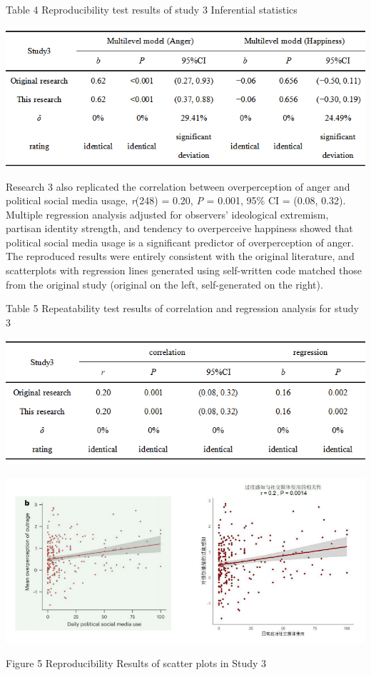 \documentclass[
  man]{apa6}
\begin{document}
\begin{center}
Table 4 Reproducibility test results of study 3 Inferential statistics
\end{center}
\begin{center}
\includegraphics{study3_Reproducibility_Plot.png}
\end{center}

Research 3 also replicated the correlation between overperception of anger and political social media usage, \emph{r}(248) = 0.20, \emph{P} = 0.001, 95\% CI = (0.08, 0.32). Multiple regression analysis adjusted for observers' ideological extremism, partisan identity strength, and tendency to overperceive happiness showed that political social media usage is a significant predictor of overperception of anger. The reproduced results were entirely consistent with the original literature, and scatterplots with regression lines generated using self-written code matched those from the original study (original on the left, self-generated on the right).

\begin{center}
Table 5 Repeatability test results of correlation and regression analysis for study 3
\end{center}
\begin{center}
\includegraphics{study3_correlation and regression_Plot.png}
\end{center}
\begin{center}
\includegraphics{study3_Scatter_Plot.png}
\end{center}
\begin{center}
Figure 5 Reproducibility Results of scatter plots in Study 3
\end{center}
\end{document}
